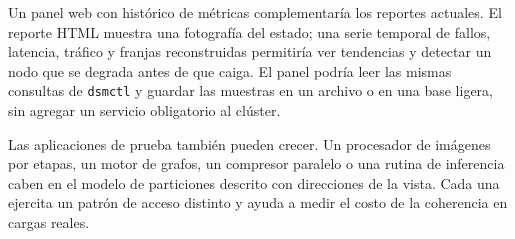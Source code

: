 Un panel web con histórico de métricas complementaría los reportes actuales. El reporte HTML muestra una fotografía del estado; una serie temporal de fallos, latencia, tráfico y franjas reconstruidas permitiría ver tendencias y detectar un nodo que se degrada antes de que caiga. El panel podría leer las mismas consultas de \texttt{dsmctl} y guardar las muestras en un archivo o en una base ligera, sin agregar un servicio obligatorio al clúster.

Las aplicaciones de prueba también pueden crecer. Un procesador de imágenes por etapas, un motor de grafos, un compresor paralelo o una rutina de inferencia caben en el modelo de particiones descrito con direcciones de la vista. Cada una ejercita un patrón de acceso distinto y ayuda a medir el costo de la coherencia en cargas reales.
